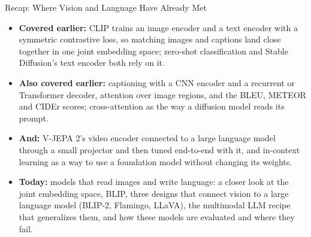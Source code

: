 \begin{frame}{Recap: Where Vision and Language Have Already Met}
  \begin{itemize}\itemsep0.35em
    \item \textbf{Covered earlier:} CLIP trains an image encoder and a text encoder with a symmetric contrastive loss, so matching images and captions land close together in one joint embedding space; zero-shot classification and Stable Diffusion's text encoder both rely on it.
    \item \textbf{Also covered earlier:} captioning with a CNN encoder and a recurrent or Transformer decoder, attention over image regions, and the BLEU, METEOR and CIDEr scores; cross-attention as the way a diffusion model reads its prompt.
    \item \textbf{And:} V-JEPA 2's video encoder connected to a large language model through a small projector and then tuned end-to-end with it, and in-context learning as a way to use a foundation model without changing its weights.
    \item \textbf{Today:} models that read images and write language: a closer look at the joint embedding space, BLIP, three designs that connect vision to a large language model (BLIP-2, Flamingo, LLaVA), the multimodal LLM recipe that generalizes them, and how these models are evaluated and where they fail.
  \end{itemize}
\end{frame}
